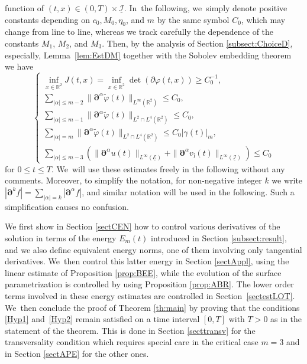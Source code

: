 \documentclass[11pt]{article}
\newcommand{\R}{{\mathbb R}}
\newcommand{\cI}{{\mathcal I}}
\newcommand{\cE}{{\mathcal E}}
\newcommand{\ul}[1]{\underline{#1}}
\theoremstyle{definition}
\begin{document}
function of $(t,x)\in(0,T)\times\ul{\cI}$. In~the following, we~simply denote positive constants depending on $c_0,M_0,\eta_0$, and $m$ by the same symbol $C_0$, which may change from line to line,
whereas we track carefully the dependence of the constants $M_1$, $M_2$, and $M_3$.
Then, by the analysis of Section \ref{subsect:ChoiceD}, especially, Lemma~\ref{lem:EstDM} together with the Sobolev embedding theorem we have
\[
\begin{cases}
\inf_{x\in\R^2}J(t,x) = \inf_{x\in\R^2}\det(\partial\varphi(t,x)) \geq C_0^{-1}, \\
\sum_{|\alpha| \leq m-2} \|\bm{\partial}^\alpha\widetilde{\varphi}(t)\|_{L^\infty(\R^2)} \leq C_0, \\
\sum_{|\alpha| \leq m-1} \|\bm{\partial}^\alpha\widetilde{\varphi}(t)\|_{L^2\cap L^4(\R^2)} \leq C_0, \\
\sum_{|\alpha| = m} \|\bm{\partial}^\alpha\widetilde{\varphi}(t)\|_{L^2\cap L^4(\R^2)} \leq C_0|\gamma(t)|_m, \\
\sum_{|\alpha| \leq m-3}(\|\bm{\partial}^\alpha u(t)\|_{L^\infty(\ul{\cE})} + \|\bm{\partial}^\alpha v_\mathrm{i}(t)\|_{L^\infty(\ul{\cI})}) \leq C_0
\end{cases}
\]
for $0\leq t\leq T$. We~will use these estimates freely in the following without any comments.
Moreover, to simplify the notation, for non-negative integer $k$ we write $|\bm{\partial}^k f|=\sum_{|\alpha|=k}|\bm{\partial}^\alpha f|$, and
similar notation will be used in the following.
Such a simplification causes no confusion.

We first show in Section \ref{sectCEN} how to control various derivatives of the solution in terms of the energy $E_m(t)$
introduced in Section \ref{subsect:result}, and we also define equivalent energy norms, one of them involving only tangential derivatives. We~then control this latter energy in Section \ref{sectAppl}, using the linear estimate of Proposition \ref{prop:BEE},
while the evolution of the surface parametrization is controlled by using Proposition \ref{prop:ABR}.
The lower order terms involved in these energy estimates are controlled in Section~\ref{sectestLOT}. We~then conclude the proof of Theorem \ref{th:main} by proving that the conditions \eqref{Hyp1} and~\eqref{Hyp2} remain satisfied
on a time interval $[0,T]$ with $T>0$ as in the statement of the theorem.
This is done in Section \ref{secttransv} for the transversality condition which requires special care in the critical case $m=3$
and in Section \ref{sectAPE} for the other ones.
\end{document}
